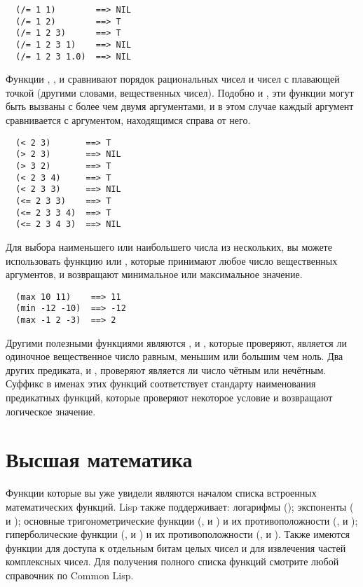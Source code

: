 \begin{verbatim}
  (/= 1 1)        ==> NIL
  (/= 1 2)        ==> T
  (/= 1 2 3)      ==> T
  (/= 1 2 3 1)    ==> NIL
  (/= 1 2 3 1.0)  ==> NIL
\end{verbatim}

Функции \code{<}, \code{>}, \code{<=} и \code{>=} сравнивают порядок рациональных чисел и чисел с
плавающей точкой (другими словами, вещественных чисел).  Подобно \code{=} и \code{/=}, эти
функции могут быть вызваны с более чем двумя аргументами, и в этом случае каждый аргумент
сравнивается с аргументом, находящимся справа от него.

\begin{verbatim}
  (< 2 3)       ==> T
  (> 2 3)       ==> NIL
  (> 3 2)       ==> T
  (< 2 3 4)     ==> T
  (< 2 3 3)     ==> NIL
  (<= 2 3 3)    ==> T
  (<= 2 3 3 4)  ==> T
  (<= 2 3 4 3)  ==> NIL
\end{verbatim}

Для выбора наименьшего или наибольшего числа из нескольких, вы можете использовать функцию
 или , которые принимают любое число вещественных аргументов, и
возвращают минимальное или максимальное значение.

\begin{verbatim}
  (max 10 11)    ==> 11
  (min -12 -10)  ==> -12
  (max -1 2 -3)  ==> 2
\end{verbatim}

Другими полезными функциями являются ,  и , которые
проверяют, является ли одиночное вещественное число равным, меньшим или большим чем ноль.
Два других предиката,  и , проверяют является ли число чётным или
нечётным.  Суффикс  в именах этих функций соответствует стандарту наименования
предикатных функций, которые проверяют некоторое условие и возвращают логическое значение.

\section{Высшая математика}

Функции которые вы уже увидели являются началом списка встроенных математических
функций. Lisp также поддерживает: логарифмы (); экспоненты ( и
); основные тригонометрические функции (,  и ) и
их противоположности (,  и ); гиперболические функции
(,  и ) и их противоположности (,
 и ).  Также имеются функции для доступа к отдельным битам целых
чисел и для извлечения частей комплексных чисел.  Для получения полного списка функций
смотрите любой справочник по Common Lisp.

